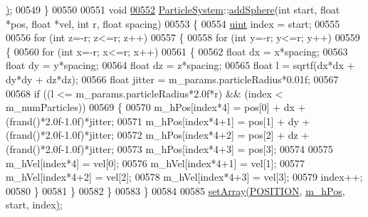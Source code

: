 \begin{DoxyCode}
{{{{{{{{      \hyperlink{class_particle_system_aa792a66680e800832059854aab0d594d}{)};
00549 \}
00550 
00551 \textcolor{keywordtype}{void}
\hypertarget{particle_system_8cpp_source_l00552}{}\hyperlink{class_particle_system_af2f16676fe8a0523cfb867a9a856970c}{00552} \hyperlink{class_particle_system}{ParticleSystem}::\hyperlink{class_particle_system_af2f16676fe8a0523cfb867a9a856970c}{addSphere}(\textcolor{keywordtype}{int} start, \textcolor{keywordtype}{float} *pos, \textcolor{keywordtype}{float} *vel, \textcolor{keywordtype}{int} r, \textcolor{keywordtype}{float} 
      spacing)
00553 \{
00554     \hyperlink{particles__kernel_8cuh_a91ad9478d81a7aaf2593e8d9c3d06a14}{uint} index = start;
00555 
00556     \textcolor{keywordflow}{for} (\textcolor{keywordtype}{int} z=-r; z<=r; z++)
00557     \{
00558         \textcolor{keywordflow}{for} (\textcolor{keywordtype}{int} y=-r; y<=r; y++)
00559         \{
00560             \textcolor{keywordflow}{for} (\textcolor{keywordtype}{int} x=-r; x<=r; x++)
00561             \{
00562                 \textcolor{keywordtype}{float} dx = x*spacing;
00563                 \textcolor{keywordtype}{float} dy = y*spacing;
00564                 \textcolor{keywordtype}{float} dz = z*spacing;
00565                 \textcolor{keywordtype}{float} l = sqrtf(dx*dx + dy*dy + dz*dz);
00566                 \textcolor{keywordtype}{float} jitter = m\_params.particleRadius*0.01f;
00567 
00568                 \textcolor{keywordflow}{if} ((l <= m\_params.particleRadius*2.0f*r) && (index < m\_numParticles))
00569                 \{
00570                     m\_hPos[index*4]   = pos[0] + dx + (frand()*2.0f-1.0f)*jitter;
00571                     m\_hPos[index*4+1] = pos[1] + dy + (frand()*2.0f-1.0f)*jitter;
00572                     m\_hPos[index*4+2] = pos[2] + dz + (frand()*2.0f-1.0f)*jitter;
00573                     m\_hPos[index*4+3] = pos[3];
00574 
00575                     m\_hVel[index*4]   = vel[0];
00576                     m\_hVel[index*4+1] = vel[1];
00577                     m\_hVel[index*4+2] = vel[2];
00578                     m\_hVel[index*4+3] = vel[3];
00579                     index++;
00580                 \}
00581             \}
00582         \}
00583     \}
00584 
00585     \hyperlink{class_particle_system_aa792a66680e800832059854aab0d594d}{setArray}\hyperlink{class_particle_system_aa792a66680e800832059854aab0d594d}{(}\hyperlink{class_particle_system_a332fbe57a36aaea5c18b4ea4fba6bbb3a9e9a2992d230a2674debf26e0e8e0299}{POSITION}\hyperlink{class_particle_system_aa792a66680e800832059854aab0d594d}{,} \hyperlink{class_particle_system_ab9d75471d2eaaeb8fa98d2f3f47d9c25}{m\_hPos}\hyperlink{class_particle_system_aa792a66680e800832059854aab0d594d}{,} start\hyperlink{class_particle_system_aa792a66680e800832059854aab0d594d}{,} index\hyperlink{class_particle_system_aa792a66680e800832059854aab0d594d}{)};
}}}}}}}}
\end{DoxyCode}
